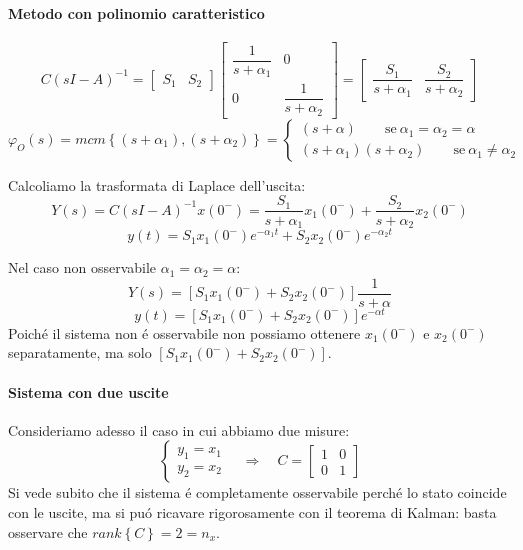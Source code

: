 \documentclass[../main.tex]{subfiles}
\begin{document}
\begin{mdframed}[style=Exercise]
\begin{Exercise}[title={Studiare l'osservabilit\'a di due vasche in parallelo}]
				\paragraph{Metodo con polinomio caratteristico}
					\[
						C(sI-A)^{-1} =
						\begin{bmatrix}
							S_1 & S_2
						\end{bmatrix}
						\begin{bmatrix}
							\dfrac{1}{s+\alpha_1} & 0\\
							0 & \dfrac{1}{s+\alpha_2}
						\end{bmatrix} =
						\begin{bmatrix}
							\dfrac{S_1}{s+\alpha_1} & \dfrac{S_2}{s+\alpha_2}
						\end{bmatrix}
					\]
					\[
						\varphi_O(s) = mcm\left\lbrace (s+\alpha_1), (s+\alpha_2) \right\rbrace =
						\begin{cases}
							(s+\alpha) \qquad\text{se}\ \alpha_1 = \alpha_2 = \alpha\\
							(s+\alpha_1)(s+\alpha_2) \qquad\text{se}\ \alpha_1 \neq \alpha_2
						\end{cases}
					\]
					
					Calcoliamo la trasformata di Laplace dell'uscita:
					\[
						Y(s) = C(sI-A)^{-1} x(0^{-}) = \dfrac{S_1}{s+\alpha_1}x_1(0^{-}) + \dfrac{S_2}{s+\alpha_2}x_2(0^{-})
					\]
					\[
						y(t) = S_1x_1(0^{-}) e^{-\alpha_1 t} + S_2x_2(0^{-}) e^{-\alpha_2 t}
					\]
					
					Nel caso non osservabile $ \alpha_1 = \alpha_2 = \alpha $:
					\[
						Y(s) = [S_1 x_1(0^{-}) + S_2 x_2(0^{-})] \dfrac{1}{s+\alpha}
					\]
					\[
						y(t) = [S_1 x_1(0^{-}) + S_2 x_2(0^{-})] e^{-\alpha t}
					\]
					Poich\'e il sistema non \'e osservabile non possiamo ottenere $ x_1(0^{-}) $ e $ x_2(0^{-}) $ separatamente, ma solo $ \left[ S_1 x_1(0^{-}) + S_2 x_2(0^{-}) \right] $.
				
				\paragraph{Sistema con due uscite}
					Consideriamo adesso il caso in cui abbiamo due misure:
					\[
						\begin{cases}
							y_1 = x_1\\
							y_2 = x_2
						\end{cases}
						\quad\Rightarrow\quad
						C =
						\begin{bmatrix}
							1 & 0\\
							0 & 1
						\end{bmatrix}
					\]
					Si vede subito che il sistema \'e completamente osservabile perch\'e lo stato coincide con le uscite, ma si pu\'o ricavare rigorosamente con il teorema di Kalman: basta osservare che $ rank\left\lbrace C \right\rbrace = 2 = n_x $.
					

\end{Exercise}
\end{mdframed}
\end{document}
